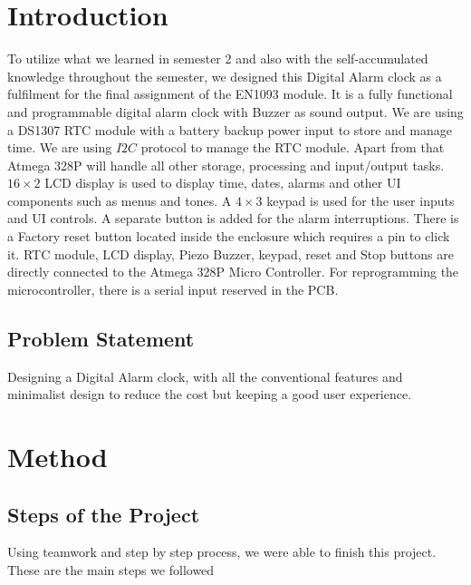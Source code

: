 \chapter{Introduction}

To utilize what we learned in semester 2 and also with the self-accumulated knowledge throughout the semester, we designed this Digital Alarm clock as a fulfilment for the final assignment of the EN1093 module. It is a fully functional and programmable digital alarm clock with Buzzer as sound output.
We are using a DS1307 RTC module with a battery backup power input to store and manage time. We are using $I2C$ protocol to manage the RTC module. Apart from that Atmega 328P will handle all other storage, processing and input/output tasks. $16\times2$ LCD display is used to display time, dates, alarms and other UI components such as menus and tones. A $4\times3$ keypad is used for the user inputs and UI controls. A separate button is added for the alarm interruptions. There is a Factory reset button located inside the enclosure which requires a pin to click it. RTC module, LCD display, Piezo Buzzer, keypad, reset and Stop buttons are directly connected to the Atmega 328P Micro Controller. For reprogramming the microcontroller, there is a serial input reserved in the PCB.


\section{Problem Statement}

Designing a Digital Alarm clock, with all the conventional features and minimalist design to reduce the cost but keeping a good user experience.



\chapter{Method}

\section{Steps of the Project}

Using teamwork and step by step process, we were able to finish this project. These are the main steps we followed


